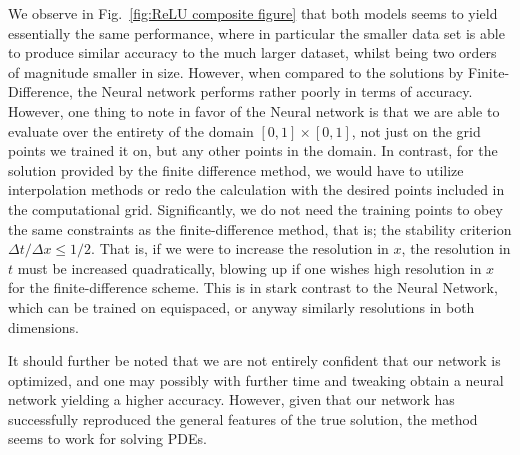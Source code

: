 \documentclass[reprint, english, nofootinbib]{revtex4-2}
\begin{document}
We observe in Fig.~\ref{fig:ReLU composite figure} that both models seems to yield essentially the same performance, where in particular the smaller data set is able to produce similar accuracy to the much larger dataset, whilst being two orders of magnitude smaller in size. However, when compared to the solutions by Finite-Difference, the Neural network performs rather poorly in terms of accuracy. However, one thing to note in favor of the Neural network is that we are able to evaluate over the entirety of the domain $[0,1]\times[0,1]$, not just on the grid points we trained it on, but any other points in the domain. In contrast, for the solution provided by the finite difference method, we would have to utilize interpolation methods or redo the calculation with the desired points included in the computational grid. Significantly, we do not need the training points to obey the same constraints as the finite-difference method, that is; the stability criterion $\Delta t / \Delta x \leq 1/2$. That is, if we were to increase the resolution in $x$, the resolution in $t$ must be increased quadratically, blowing up if one wishes high resolution in $x$ for the finite-difference scheme. This is in stark contrast to the Neural Network, which can be trained on equispaced, or anyway similarly resolutions in both dimensions.

It should further be noted that we are not entirely confident that our network is optimized, and one may possibly with further time and tweaking obtain a neural network yielding a higher accuracy. However, given that our network has successfully reproduced the general features of the true solution, the method seems to work for solving PDEs. 

\end{document}
